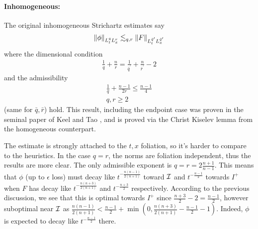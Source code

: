 \documentclass[11pt, oneside]{amsart}
\begin{document}
	\paragraph{Inhomogeneous:}
	The original inhomogeneous Strichartz estimates say
	\begin{equation*}
		\begin{gathered}
			\left\lVert \phi\right\rVert_{L_t^qL_x^r}\lesssim_{q,r}\left\lVert F\right\rVert_{L_t^{\bar{q}^\prime}L_x^{\bar{q}^\prime}}
		\end{gathered}
	\end{equation*}
	where the dimensional condition
	\begin{equation*}
		\begin{gathered}
			\frac{1}{q}+\frac{n}{r}=\frac{1}{\bar{q}^\prime}+\frac{n}{\bar{r}^\prime}-2
		\end{gathered}
	\end{equation*}
	and the admissibility 
	\begin{equation*}
		\begin{gathered}
			\frac{1}{q}+\frac{n-1}{2r}\leq\frac{n-1}{4}\\
			q,r\geq2
		\end{gathered}
	\end{equation*}
	(same for $\bar{q},\bar{r}$) hold. This result, including the endpoint case was proven in the seminal paper of Keel and Tao \cite{keel_endpoint_1998}, and is proved via the Christ Kiselev lemma from the homogeneous counterpart. 
	
	The estimate is strongly attached to the $t,x$ foliation, so it's harder to compare to the heuristics.	In the case $q=r$, the norms are foliation independent, thus the results are more clear. The only admissible exponent is $q=r=2\frac{n+1}{n-1}$. This means that $\phi$ (up to $\epsilon$ loss) must decay like $t^{-\frac{n(n-1)}{2(n+1)}}$ toward $\mathcal{I}$ and $t^{-\frac{n-1}{2}}$ towards $I^+$ when $F$ has decay like $t^{-\frac{n(n+3)}{2(n+1)}}$ and $t^{-\frac{n+3}{2}}$ respectively. According to the previous discussion, we see that this is optimal towards $I^+$ since $\frac{n+3}{2}-2=\frac{n-1}{2}$, however suboptimal near $\mathcal{I}$ as $\frac{n(n-1)}{2(n+1)}<\frac{n-1}{2}+\min(0,\frac{n(n+3)}{2(n+1)}-\frac{n-1}{2}-1)$. Indeed, $\phi$ is expected to decay like $t^{-\frac{n-1}{2}}$ there.
	 
\end{document}
